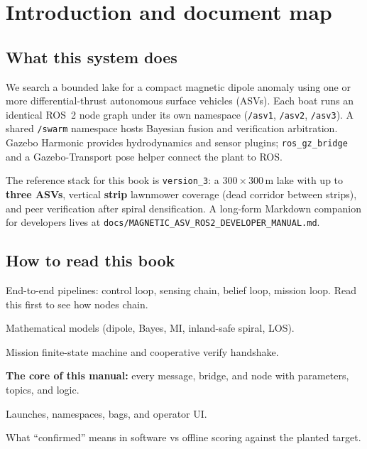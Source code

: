 \chapter{Introduction and document map}
\label{ch:intro}

\section{What this system does}
We search a bounded lake for a compact magnetic dipole anomaly using one or
more differential-thrust autonomous surface vehicles (ASVs). Each boat runs an
identical ROS~2 node graph under its own namespace (\texttt{/asv1},
\texttt{/asv2}, \texttt{/asv3}). A shared \texttt{/swarm} namespace hosts
Bayesian fusion and verification arbitration. Gazebo Harmonic provides
hydrodynamics and sensor plugins; \texttt{ros\_gz\_bridge} and a
Gazebo-Transport pose helper connect the plant to ROS.

The reference stack for this book is \texttt{version\_3}: a
\(300\times300\,\mathrm{m}\) lake with up to \textbf{three ASVs}, vertical
\textbf{strip} lawnmower coverage (dead corridor between strips), and peer
verification after spiral densification. A long-form Markdown companion for
developers lives at
\texttt{docs/MAGNETIC\_ASV\_ROS2\_DEVELOPER\_MANUAL.md}.

\section{How to read this book}
\begin{description}[style=nextline,leftmargin=1.2cm]
  \item[Chapter~\ref{ch:pipelines}] End-to-end pipelines: control loop, sensing
        chain, belief loop, mission loop. Read this first to see how nodes
        chain.
  \item[Chapter~\ref{ch:algorithms}] Mathematical models (dipole, Bayes, MI,
        inland-safe spiral, LOS).
  \item[Chapter~\ref{ch:fsm}] Mission finite-state machine and cooperative
        verify handshake.
  \item[Chapter~\ref{ch:ros-catalog}] \textbf{The core of this manual:} every
        message, bridge, and node with parameters, topics, and logic.
  \item[Chapter~\ref{ch:ops}] Launches, namespaces, bags, and operator UI.
  \item[Chapter~\ref{ch:accept}] What ``confirmed'' means in software vs
        offline scoring against the planted target.
\end{description}

